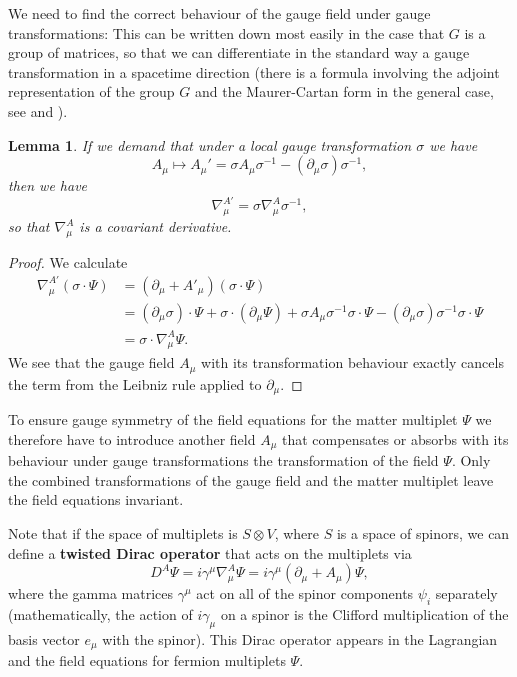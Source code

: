 \documentclass[11pt]{amsart}
\newtheorem{lem}[thm]{Lemma}
\theoremstyle{definition}
\theoremstyle{remark}
\numberwithin{equation}{section}
\begin{document}
We need to find the correct behaviour of the gauge field under gauge transformations: This can be written down most easily in the case that $G$ is a group of matrices, so that we can differentiate in the standard way a gauge transformation in a spacetime direction (there is a formula involving the adjoint representation of the group $G$ and the Maurer-Cartan form in the general case, see \cite[p.~79]{Baum} and \cite[p.~303]{Naber}). 
\begin{lem}\label{lem gauge transform gauge field}
If we demand that under a local gauge transformation $\sigma$ we have 
\begin{equation*}
A_\mu\longmapsto A_\mu'=\sigma A_\mu \sigma^{-1}-(\partial_\mu\sigma)\sigma^{-1},
\end{equation*}
then we have 
\begin{equation*}
\nabla_\mu^{A'}=\sigma\nabla_\mu^A \sigma^{-1},
\end{equation*}
so that $\nabla_\mu^A$ is a covariant derivative. 
\end{lem}
\begin{proof}
We calculate
\begin{align*}
\nabla_\mu^{A'}(\sigma\cdot\Psi)&=(\partial_\mu+A'_\mu)(\sigma\cdot\Psi)\\
&=(\partial_\mu\sigma)\cdot\Psi+\sigma\cdot(\partial_\mu\Psi)+\sigma A_\mu\sigma^{-1}\sigma\cdot\Psi-(\partial_\mu\sigma)\sigma^{-1}\sigma\cdot\Psi\\
&=\sigma\cdot\nabla^A_\mu\Psi.
\end{align*}
We see that the gauge field $A_\mu$ with its transformation behaviour exactly cancels the term from the Leibniz rule applied to $\partial_\mu$.
\end{proof}
To ensure gauge symmetry of the field equations for the matter multiplet $\Psi$ we therefore have to introduce another field $A_\mu$ that compensates or absorbs with its behaviour under gauge transformations the transformation of the field $\Psi$. Only the combined transformations of the gauge field and the matter multiplet leave the field equations invariant.

Note that if the space of multiplets is $S\otimes V$, where $S$ is a space of spinors, we can define a {\bf twisted Dirac operator} that acts on the multiplets via 
\begin{equation*}
D^A\Psi=i\gamma^\mu\nabla^A_\mu\Psi=i\gamma^\mu(\partial_\mu+A_\mu)\Psi,
\end{equation*}
where the gamma matrices $\gamma^\mu$ act on all of the spinor components $\psi_i$ separately (mathematically, the action of $i\gamma_\mu$ on a spinor is the Clifford multiplication of the basis vector $e_\mu$ with the spinor). This Dirac operator appears in the Lagrangian and the field equations for fermion multiplets $\Psi$.
\end{document}
